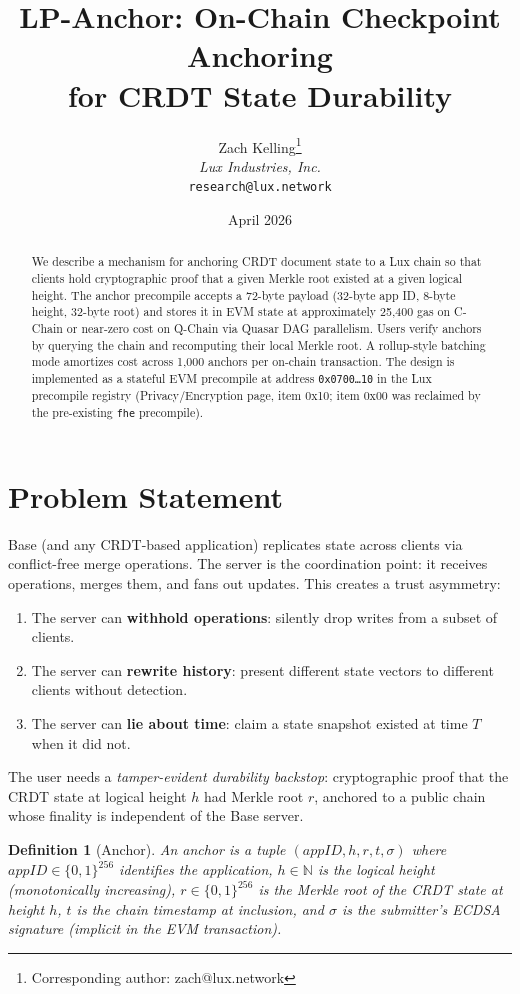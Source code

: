 \documentclass[11pt,a4paper]{article}
\title{LP-Anchor: On-Chain Checkpoint Anchoring\\for CRDT State Durability}
\author{
Zach Kelling\thanks{Corresponding author: zach@lux.network}\\
\textit{Lux Industries, Inc.}\\
\texttt{research@lux.network}
}
\date{April 2026}
\newtheorem{definition}{Definition}[section]
\begin{document}
\luxcoverpage

\begin{abstract}
We describe a mechanism for anchoring CRDT document state to a Lux chain
so that clients hold cryptographic proof that a given Merkle root existed at
a given logical height. The anchor precompile accepts a 72-byte payload
(32-byte app ID, 8-byte height, 32-byte root) and stores it in EVM state
at approximately 25,400 gas on C-Chain or near-zero cost on Q-Chain via
Quasar DAG parallelism. Users verify anchors by querying the chain and
recomputing their local Merkle root. A rollup-style batching mode amortizes
cost across 1,000 anchors per on-chain transaction. The design is
implemented as a stateful EVM precompile at address \texttt{0x0700\ldots10}
in the Lux precompile registry (Privacy/Encryption page, item 0x10; item
0x00 was reclaimed by the pre-existing \texttt{fhe} precompile).
\end{abstract}

\tableofcontents

\section{Problem Statement}
\label{sec:problem}

Base (and any CRDT-based application) replicates state across clients via
conflict-free merge operations. The server is the coordination point: it
receives operations, merges them, and fans out updates. This creates a
trust asymmetry:

\begin{enumerate}[nosep]
  \item The server can \textbf{withhold operations}: silently drop writes
        from a subset of clients.
  \item The server can \textbf{rewrite history}: present different state
        vectors to different clients without detection.
  \item The server can \textbf{lie about time}: claim a state snapshot
        existed at time $T$ when it did not.
\end{enumerate}

\noindent
The user needs a \emph{tamper-evident durability backstop}: cryptographic
proof that the CRDT state at logical height $h$ had Merkle root $r$,
anchored to a public chain whose finality is independent of the Base server.

\begin{definition}[Anchor]
An anchor is a tuple $(\mathit{appID}, h, r, t, \sigma)$ where
$\mathit{appID} \in \{0,1\}^{256}$ identifies the application,
$h \in \mathbb{N}$ is the logical height (monotonically increasing),
$r \in \{0,1\}^{256}$ is the Merkle root of the CRDT state at height $h$,
$t$ is the chain timestamp at inclusion, and $\sigma$ is the submitter's
ECDSA signature (implicit in the EVM transaction).
\end{definition}
\end{document}
